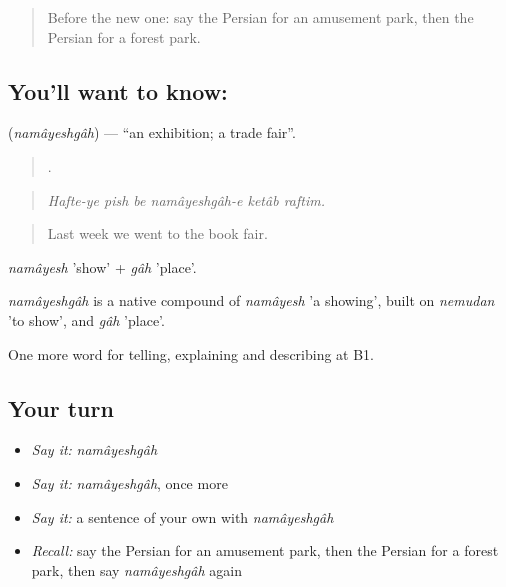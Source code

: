 \label{lesson:FA-C455-namayeshgah}



\begin{quote}
Before the new one: say the Persian for an amusement park, then the Persian for a forest park.
\end{quote}

\subsection*{You'll want to know: }
\textbf{} (\emph{namâyeshgâh}) — \textquotedblleft{}an exhibition; a trade fair\textquotedblright{}.

\begin{quote}
     .
\end{quote}

\begin{quote}
\emph{Hafte-ye pish be namâyeshgâh-e ketâb raftim.}
\end{quote}

\begin{quote}
Last week we went to the book fair.
\end{quote}

\emph{namâyesh} 'show' + \emph{gâh} 'place'.

\begin{cousinweb}
\emph{namâyeshgâh} is a native compound of \emph{namâyesh} 'a showing', built on \emph{nemudan} 'to show', and \emph{gâh} 'place'.
\end{cousinweb}

\begin{grammarlens}[title={What you've built}]
One more word for telling, explaining and describing at B1.
\end{grammarlens}

\subsection*{Your turn}
\begin{itemize}
\raggedright
  \item \emph{Say it:} \emph{namâyeshgâh}
  \item \emph{Say it:} \emph{namâyeshgâh}, once more
  \item \emph{Say it:} a sentence of your own with \emph{namâyeshgâh}
  \item \emph{Recall:} say the Persian for an amusement park, then the Persian for a forest park, then say \emph{namâyeshgâh} again
\end{itemize}

